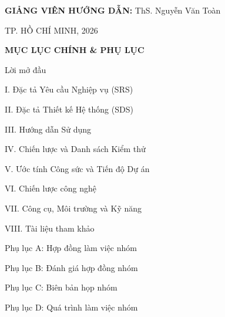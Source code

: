 \documentclass[12pt,a4paper]{article}
\begin{document}
\begin{titlepage}
\begin{flushleft}
        \vspace{0.8cm}
        \hspace{2.5cm} \textbf{GIẢNG VIÊN HƯỚNG DẪN:} \quad ThS. Nguyễn Văn Toàn
    \end{flushleft}

    \vfill
    \begin{center}
        TP. HỒ CHÍ MINH, 2026
    \end{center}
\end{titlepage}
\clearpage 

\begin{center}
    \fontsize{16}{20}\selectfont\bfseries\color{pillarBlue} MỤC LỤC CHÍNH \& PHỤ LỤC
\end{center}
\vspace{0.5cm}

\par
\vspace{0.3cm}
{
    \large 
    \setlength{\parskip}{0.5em} 
    
    \noindent Lời mở đầu \par
    \noindent I. Đặc tả Yêu cầu Nghiệp vụ (SRS)\par
    \noindent II. Đặc tả Thiết kế Hệ thống (SDS) \par
    \noindent III. Hướng dẫn Sử dụng \par
    \noindent IV. Chiến lược và Danh sách Kiểm thử \par
    \noindent V. Ước tính Công sức và Tiến độ Dự án \par
    \noindent VI. Chiến lược công nghệ \par
    \noindent VII. Công cụ, Môi trường và Kỹ năng \par
    \noindent VIII. Tài liệu tham khảo \par
}

\vspace{1cm}

\par
\vspace{0.3cm}
{
    \large
    \setlength{\parskip}{0.5em}
    
    \noindent Phụ lục A: Hợp đồng làm việc nhóm\par
    \noindent Phụ lục B: Đánh giá hợp đồng nhóm\par
    \noindent Phụ lục C: Biên bản họp nhóm\par
    \noindent Phụ lục D: Quá trình làm việc nhóm\par
}
\end{document}

